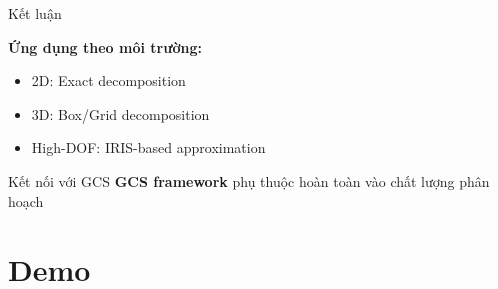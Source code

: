 \documentclass[aspectratio=169]{beamer}
\begin{document}

\begin{frame}{Kết luận}

    \textbf{Ứng dụng theo môi trường:}
    \begin{itemize}
        \item 2D: Exact decomposition
        \item 3D: Box/Grid decomposition
        \item High-DOF: IRIS-based approximation
    \end{itemize}

    \vspace{1em}
    \begin{alertblock}{Kết nối với GCS}
        \textbf{GCS framework} phụ thuộc hoàn toàn vào chất lượng phân hoạch
    \end{alertblock}

\end{frame}

\section{Demo}


        
    
\end{document}
